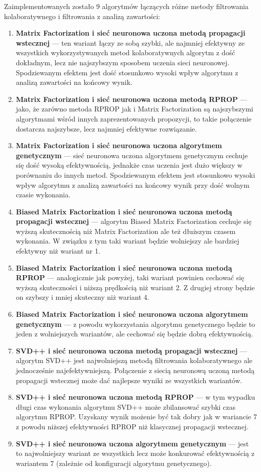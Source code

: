 \documentclass[twoside]{iisthesis}
\begin{document}
		 Zaimplementowanych zostało 9 algorytmów łączących różne metody filtrowania kolaboratywnego i filtrowania z analizą zawartości:
		 
		 \begin{enumerate}
		 	\item \textbf{Matrix Factorization i sieć neuronowa uczona metodą propagacji wstecznej} --- ten wariant łączy ze sobą szybki, ale najmniej efektywny ze wszystkich wykorzystywanych metod kolaboratywnych algorytm z dość dokładnym, lecz nie najszybszym sposobem uczenia sieci neuronowej. Spodziewanym efektem jest dość stosunkowo wysoki wpływ algorytmu z analizą zawartości na końcowy wynik. 
		 	\item \textbf{Matrix Factorization i sieć neuronowa uczona metodą RPROP} --- jako, że zarówno metoda RPROP jak i Matrix Factorization są najszybszymi algorytmami wśród innych zaprezentowanych propozycji, to takie połączenie dostarcza najszybsze, lecz najmniej efektywne rozwiązanie.
		 	\item \textbf{Matrix Factorization i sieć neuronowa uczona algorytmem genetycznym} --- sieć neuronowa uczona algorytmem genetycznym cechuje się dość wysoką efektywnością, jednakże czas uczenia jest dużo większy w porównaniu do innych metod. Spodziewanym efektem jest stosunkowo wysoki wpływ algorytmu z analizą zawartości na końcowy wynik przy dość wolnym czasie wykonania.
		 	\item \textbf{Biased Matrix Factorization i sieć neuronowa uczona metodą propagacji wstecznej} --- algorytm Biased Matrix Factorization cechuje się wyższą skutecznością niż Matrix Factorization ale też dłuższym czasem wykonania. W związku z tym taki wariant będzie wolniejszy ale bardziej efektywny niż wariant nr 1.
		 	\item \textbf{Biased Matrix Factorization i sieć neuronowa uczona metodą RPROP} --- analogicznie jak powyżej, taki wariant powinien cechować się wyższą skuteczności i niższą prędkością niż wariant 2. Z drugiej strony będzie on szybszy i mniej skuteczny niż wariant 4.
		 	\item \textbf{Biased Matrix Factorization i sieć neuronowa uczona algorytmem genetycznym} ---  z powodu wykorzystania algorytmu genetycznego będzie to jeden z wolniejszych wariantów, ale cechować się będzie dobrą efektywnością.	 	
		 	\item \textbf{SVD++ i sieć neuronowa uczona metodą propagacji wstecznej} --- algorytm SVD++ jest najwolniejszą metodą filtrowania kolaboratywnego ale jednocześnie najefektywniejszą. Połączenie z siecią neuronową uczoną metodą propagacji wstecznej może dać najlepsze wyniki ze wszystkich wariantów.
		 	\item \textbf{SVD++ i sieć neuronowa uczona metodą RPROP} --- w tym wypadku długi czas wykonania algorytmu SVD++ może zbilansować szybki czas algorytmu RPROP. Uzyskany wynik możenie być tak dobry jak w wariancie 7 z powodu niższej efektywności RPROP niż klasycznej propagacji wstecznej.
		 	\item \textbf{SVD++ i sieć neuronowa uczona algorytmem genetycznym} --- jest to najwolniejszy wariant ze wszystkich lecz może konkurować efektywnością z wariantem 7 (zależnie od konfiguracji algorytmu genetycznego).
		 \end{enumerate}
	 
\end{document}
